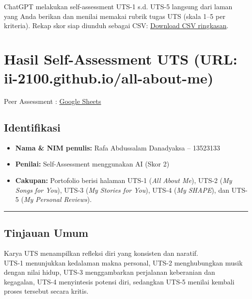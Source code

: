 \documentclass[
  letterpaper,
  DIV=11,
  numbers=noendperiod]{scrreprt}
\providecommand{\tightlist}{%
  \setlength{\itemsep}{0pt}\setlength{\parskip}{0pt}}
\begin{document}
ChatGPT melakukan self-assessment UTS-1 s.d. UTS-5 langsung dari laman
yang Anda berikan dan menilai memakai rubrik tugas UTS (skala 1--5 per
kriteria). Rekap skor siap diunduh sebagai CSV:
\href{sandbox:/mnt/data/UTS_self_assessment.csv}{Download CSV
ringkasan}.


\chapter{Hasil Self-Assessment UTS (URL:
ii-2100.github.io/all-about-me)}\label{hasil-self-assessment-uts-url-ii-2100.github.ioall-about-me}

Peer Assessment :
\href{https://docs.google.com/spreadsheets/d/1FLw14LOiKn4t99ypaKcr6dmhyrHQTFbX/edit?usp=sharing&ouid=110892378776802188439&rtpof=true&sd=true}{Google
Sheets}

\section{Identifikasi}\label{identifikasi}

\begin{itemize}
\tightlist
\item
  \textbf{Nama \& NIM penulis:} Rafa Abdussalam Danadyaksa -- 13523133\\
\item
  \textbf{Penilai:} Self-Assessment menggunakan AI (Skor 2)\\
\item
  \textbf{Cakupan:} Portofolio berisi halaman UTS-1 (\emph{All About
  Me}), UTS-2 (\emph{My Songs for You}), UTS-3 (\emph{My Stories for
  You}), UTS-4 (\emph{My SHAPE}), dan UTS-5 (\emph{My Personal
  Reviews}).
\end{itemize}

\begin{center}\rule{0.5\linewidth}{0.5pt}\end{center}

\section{Tinjauan Umum}\label{tinjauan-umum}

Karya UTS menampilkan refleksi diri yang konsisten dan naratif.\\
UTS-1 menunjukkan kedalaman makna personal, UTS-2 menghubungkan musik
dengan nilai hidup, UTS-3 menggambarkan perjalanan keberanian dan
kegagalan, UTS-4 menyintesis potensi diri, sedangkan UTS-5 menilai
kembali proses tersebut secara kritis.
\end{document}
